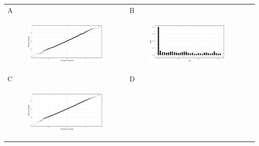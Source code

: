 \documentclass[11pt]{article}
\begin{document}
\begin{suppfigure}[ht]
	\begin{tabular}{lll}
	A&B\\
	\begin{subfigure}[t]{0.49\linewidth}
		\centering
		\includegraphics[width=1\linewidth]{figs/supp-figure-2a.pdf} 
	\end{subfigure}&
	\begin{subfigure}[t]{0.49\linewidth}
		\centering
		\includegraphics[width=1\linewidth]{figs/supp-figure-2b.pdf}
	\end{subfigure}&\\
	C&D\\
	\begin{subfigure}[t]{0.49\linewidth}
		\centering
		\includegraphics[width=1\linewidth]{figs/supp-figure-2c.pdf}

\end{subfigure}
\end{tabular}
\end{suppfigure}
\end{document}
